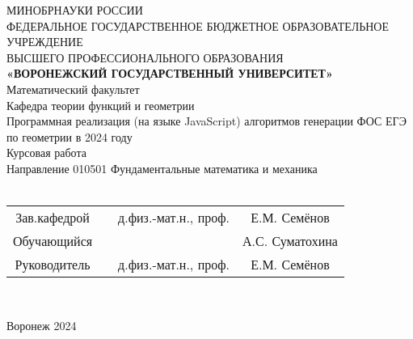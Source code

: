 
\thispagestyle{empty}
\begin{center}
	\hfill \break
	\large{МИНОБРНАУКИ РОССИИ}\\
	\footnotesize{ФЕДЕРАЛЬНОЕ ГОСУДАРСТВЕННОЕ БЮДЖЕТНОЕ ОБРАЗОВАТЕЛЬНОЕ УЧРЕЖДЕНИЕ}\\
	\footnotesize{ВЫСШЕГО ПРОФЕССИОНАЛЬНОГО ОБРАЗОВАНИЯ}\\
	\small{\textbf{«ВОРОНЕЖСКИЙ ГОСУДАРСТВЕННЫЙ УНИВЕРСИТЕТ»}}\\
	\hfill \break
	\normalsize{Математический факультет}\\
	\hfill \break
	\normalsize{Кафедра теории функций и геометрии}\\
	\hfill \break
	\large{Программная реализация (на языке JavaScript) алгоритмов генерации ФОС ЕГЭ по геометрии в 2024 году}\\
	\hfill \break
	\hfill \break
	\normalsize{Курсовая работа\\
		\hfill \break
		Направление  010501 Фундаментальные математика и механика\\
		\hfill \break
	}\\
\end{center}
\hfill \break
\normalsize{
	\begin{tabular}{cccc}
		Зав.кафедрой & \underline{\hspace{3cm}} & д.физ.-мат.н.,  проф. & Е.М. Семёнов    \\
		Обучающийся  & \underline{\hspace{3cm}} &                       & А.С. Суматохина \\
		Руководитель & \underline{\hspace{3cm}} & д.физ.-мат.н.,  проф. & Е.М. Семёнов    \\
	\end{tabular}
}\\
\hfill \break
\hfill \break
\hfill \break
\begin{center} Воронеж 2024 \end{center}
\newpage
